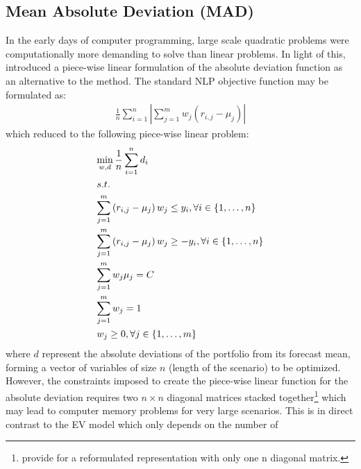 \subsection{Mean Absolute Deviation (MAD)}
In the early days of computer programming, large scale quadratic problems
were computationally more demanding to solve than linear problems. In light
of this, \citet{Konno1991} introduced a piece-wise linear formulation of
the absolute deviation function as an alternative to the
\citet{Markowitz1952} method. The standard NLP objective function may be
formulated as:
\begin{equation}\label{madnlp}
\begin{gathered}
\frac{1}{n}\sum\limits_{i=1}^n {\left| {\sum\limits_{j=1}^m {{w_j}\left( {{r_{i,j}} - {\mu _j}} \right)} } \right|}
\end{gathered}
\end{equation}
which \citet{Konno1991} reduced to the following piece-wise linear problem:
\begin{equation}\label{madlp}
\begin{gathered}
  \mathop {\min }\limits_{w,d} \frac{1}{n}\sum\limits_{i=1}^n {{d_i}}  \hfill \\
  s.t. \hfill \\
  \sum\limits_{j=1}^m {\left( {{r_{i,j}} - {\mu _j}} \right){w_j} \leq {y_i},\forall i \in \left\{ {1,\dots,n} \right\}}  \hfill \\
  \sum\limits_{j=1}^m {\left( {{r_{i,j}} - {\mu _j}} \right){w_j} \geq  - {y_i},\forall i \in \left\{ {1,\dots,n} \right\}}  \hfill \\
  \sum\limits_{j=1}^m {{w_j}{\mu _j}=C}  \hfill \\
  \sum\limits_{j=1}^m {{w_j}=1}  \hfill \\
  {w_j} \geq 0,\forall j \in \left\{ {1,\dots,m} \right\} \hfill \\
\end{gathered}
\end{equation}
where $d$ represent the absolute deviations of the portfolio from its
forecast mean, forming a vector of variables of size $n$ (length of the
scenario) to be optimized. However, the constraints imposed to create the
piece-wise linear function for the absolute deviation requires two $n\times
n$ diagonal matrices stacked together\footnote{\citet{Feinstein1993}
provide for a reformulated representation with only one n diagonal matrix.}
which may lead to computer memory problems for very large scenarios. This is
in direct contrast to the EV model which only depends on the number of
